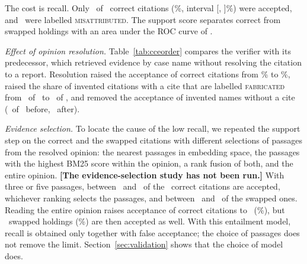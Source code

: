 \documentclass[conference]{IEEEtran}
\begin{document}
The cost is recall. Only \ResStressCorrectAccepted\ of \ResStressCorrectN\ correct citations (\ResStressCorrectAcceptedPct\%, interval [\ResStressCorrectAcceptedLow, \ResStressCorrectAcceptedHigh]\%) were accepted, and \ResStressCorrectMisattributed\ were labelled \textsc{misattributed}. The support score separates correct from swapped holdings with an area under the ROC curve of \ResStressAUC.

\emph{Effect of opinion resolution.} Table~\ref{tab:cceorder} compares the verifier with its predecessor, which retrieved evidence by case name without resolving the citation to a report. Resolution raised the acceptance of correct citations from \ResStressOldCorrectAcceptedPct\% to \ResStressCorrectAcceptedPct\%, raised the share of invented citations with a cite that are labelled \textsc{fabricated} from \ResStressOldFabCiteFabricated\ of \ResStressOldFabCiteN\ to \ResStressFabCiteFabricated\ of \ResStressFabCiteN, and removed the acceptance of invented names without a cite (\ResStressOldFabNoCiteAccepted\ of \ResStressOldFabNoCiteN\ before, \ResStressFabNoCiteAccepted\ after).

\emph{Evidence selection.} To locate the cause of the low recall, we repeated the support step on the correct and the swapped citations with different selections of passages from the resolved opinion: the nearest passages in embedding space, the passages with the highest BM25 score within the opinion, a rank fusion of both, and the entire opinion.
\ifnum{}
\textbf{[The evidence-selection study has not been run.]}
\fi
With three or five passages, between \ResEvFewCorrectMin\ and \ResEvFewCorrectMax\ of the \ResEvCorrectTotal\ correct citations are accepted, whichever ranking selects the passages, and between \ResEvFewSwappedMin\ and \ResEvFewSwappedMax\ of the swapped ones. Reading the entire opinion raises acceptance of correct citations to \ResEvWholeCorrect\ (\ResEvWholeCorrectPct\%), but \ResEvWholeSwapped\ swapped holdings (\ResEvWholeSwappedPct\%) are then accepted as well. With this entailment model, recall is obtained only together with false acceptance; the choice of passages does not remove the limit. Section~\ref{sec:validation} shows that the choice of model does.
\end{document}
